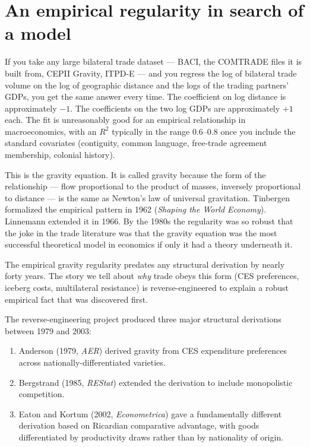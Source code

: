 \documentclass[11pt,letterpaper,oneside]{book}
\theoremstyle{definition}
\theoremstyle{remark}
\begin{document}
\section{An empirical regularity in search of a model}

If you take any large bilateral trade dataset --- BACI, the COMTRADE files it is built from, CEPII Gravity, ITPD-E --- and you regress the log of bilateral trade volume on the log of geographic distance and the logs of the trading partners' GDPs, you get the same answer every time. The coefficient on log distance is approximately $-1$. The coefficients on the two log GDPs are approximately $+1$ each. The fit is unreasonably good for an empirical relationship in macroeconomics, with an $R^2$ typically in the range $0.6$--$0.8$ once you include the standard covariates (contiguity, common language, free-trade agreement membership, colonial history).

This is the gravity equation. It is called gravity because the form of the relationship --- flow proportional to the product of masses, inversely proportional to distance --- is the same as Newton's law of universal gravitation. Tinbergen formalized the empirical pattern in 1962 (\emph{Shaping the World Economy}). Linnemann extended it in 1966. By the 1980s the regularity was so robust that the joke in the trade literature was that the gravity equation was the most successful theoretical model in economics if only it had a theory underneath it.

\begin{tcolorbox}[insight]
The empirical gravity regularity predates any structural derivation by nearly forty years. The story we tell about \emph{why} trade obeys this form (CES preferences, iceberg costs, multilateral resistance) is reverse-engineered to explain a robust empirical fact that was discovered first.
\end{tcolorbox}

The reverse-engineering project produced three major structural derivations between 1979 and 2003:

\begin{enumerate}
\item Anderson (1979, \emph{AER}) derived gravity from CES expenditure preferences across nationally-differentiated varieties.
\item Bergstrand (1985, \emph{REStat}) extended the derivation to include monopolistic competition.
\item Eaton and Kortum (2002, \emph{Econometrica}) gave a fundamentally different derivation based on Ricardian comparative advantage, with goods differentiated by productivity draws rather than by nationality of origin.
\end{enumerate}
\end{document}
